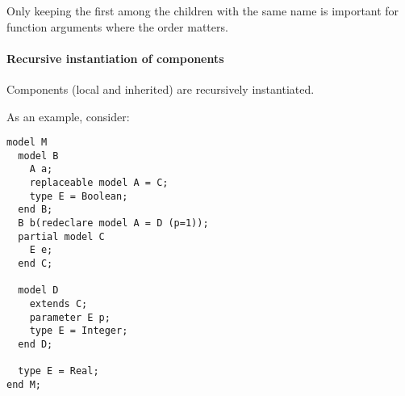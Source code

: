 \begin{nonnormative}
Only keeping the first among the children with the same name is important for function arguments where the order matters.
\end{nonnormative}

\paragraph*{Recursive instantiation of components}

Components (local and inherited) are recursively instantiated.

\begin{example}
As an example, consider:
\begin{lstlisting}[language=modelica]
model M
  model B
    A a;
    replaceable model A = C;
    type E = Boolean;
  end B;
  B b(redeclare model A = D (p=1));
  partial model C
    E e;
  end C;

  model D
    extends C;
    parameter E p;
    type E = Integer;
  end D;

  type E = Real;
end M;
\end{lstlisting}


\end{example}
